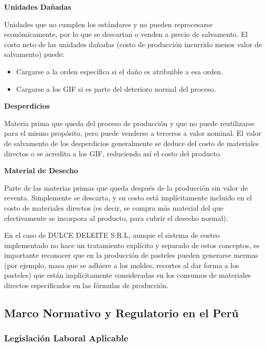 \documentclass[
  stu,
  floatsintext,
  longtable,
  a4paper,
  nolmodern,
  notxfonts,
  notimes,
  12pt,
  colorlinks=true,linkcolor=blue,citecolor=blue,urlcolor=blue]{apa7}
\providecommand{\tightlist}{%
  \setlength{\itemsep}{0pt}\setlength{\parskip}{0pt}}
\begin{document}
\textbf{Unidades Dañadas}

Unidades que no cumplen los estándares y no pueden reprocesarse
económicamente, por lo que se descartan o venden a precio de salvamento.
El costo neto de las unidades dañadas (costo de producción incurrido
menos valor de salvamento) puede:

\begin{itemize}
\tightlist
\item
  Cargarse a la orden específica si el daño es atribuible a esa orden.
\item
  Cargarse a los GIF si es parte del deterioro normal del proceso.
\end{itemize}

\textbf{Desperdicios}

Materia prima que queda del proceso de producción y que no puede
reutilizarse para el mismo propósito, pero puede venderse a terceros a
valor nominal. El valor de salvamento de los desperdicios generalmente
se deduce del costo de materiales directos o se acredita a los GIF,
reduciendo así el costo del producto.

\textbf{Material de Desecho}

Parte de las materias primas que queda después de la producción sin
valor de reventa. Simplemente se descarta, y su costo está
implícitamente incluido en el costo de materiales directos (es decir, se
compra más material del que efectivamente se incorpora al producto, para
cubrir el desecho normal).

En el caso de DULCE DELEITE S.R.L, aunque el sistema de costeo
implementado no hace un tratamiento explícito y separado de estos
conceptos, es importante reconocer que en la producción de pasteles
pueden generarse mermas (por ejemplo, masa que se adhiere a los moldes,
recortes al dar forma a los pasteles) que están implícitamente
consideradas en los consumos de materiales directos especificados en las
fórmulas de producción.

\subsection{Marco Normativo y Regulatorio en el
Perú}\label{marco-normativo-y-regulatorio-en-el-peruxfa}

\subsubsection{Legislación Laboral
Aplicable}\label{legislaciuxf3n-laboral-aplicable}
\end{document}
